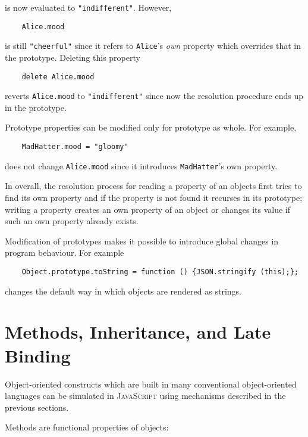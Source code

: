 \documentclass{article}
\newcommand{\js}{\textsc{JavaScript}\xspace}
\newcommand{\out}[1]{\texttt{#1}}
\begin{document}
is now evaluated to \out{"indifferent"}. However,

\begin{lstlisting}
    Alice.mood
\end{lstlisting}

is still \out{"cheerful"} since it refers to \lstinline|Alice|'s \emph{own}
property which overrides that in the prototype. Deleting this property

\begin{lstlisting}
    delete Alice.mood
\end{lstlisting}

reverts \lstinline|Alice.mood| to \out{"indifferent"} since now the resolution
procedure ends up in the prototype.

Prototype properties can be modified only for prototype as whole. For example,

\begin{lstlisting}
    MadHatter.mood = "gloomy"
\end{lstlisting}

does not change \lstinline|Alice.mood| since it introduces \lstinline|MadHatter|'s own
property.

In overall, the resolution process for reading a property of an objects first
tries to find its own property and if the property is not found it recurses in
its prototype; writing a property creates an own property of an object or
changes its value if such an own property already exists. 

Modification of prototypes makes it possible to introduce global changes in
program behaviour. For example

\begin{lstlisting}
    Object.prototype.toString = function () {JSON.stringify (this);};
\end{lstlisting}

changes the default way in which objects are rendered as strings. 

\section{Methods, Inheritance, and Late Binding}
\label{sec:inheritance}

Object-oriented constructs which are built in many conventional object-oriented
languages can be simulated in \js using mechanisms described in the previous sections.

Methods are functional properties of objects:
\end{document}
